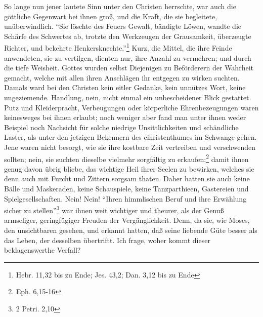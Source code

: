 So lange nun jener lautete Sinn unter den Christen herrschte, war auch die göttliche Gegenwart bei ihnen groß, und die Kraft, die sie begleitete, unüberwindlich. "`Sie löschte des Feuers Gewalt, bändigte Löwen, wandte die Schärfe des Schwertes ab, trotzte den Werkzeugen der Grausamkeit, überzeugte Richter, und bekehrte Henkersknechte."'\footnote{Hebr. 11,32 bis zu Ende; Jes. 43,2; Dan. 3,12 bis zu Ende} Kurz, die Mittel, die ihre Feinde anwendeten, sie zu vertilgen, dienten nur, ihre Anzahl zu vermehren; und durch die tiefe Weisheit. Gottes wurden selbst Diejenigen zu Beförderern der Wahrheit gemacht, welche mit allen ihren Anschlägen ihr entgegen zu wirken suchten. Damals ward bei den Christen kein eitler Gedanke, kein unnützes Wort, keine ungeziemende. Handlung, nein, nicht einmal ein unbescheidener Blick gestattet. Putz und Kleiderpracht, Verbeugungen oder körperliche Ehrenbezeugungen waren keinesweges bei ihnen erlaubt; noch weniger aber fand man unter ihnen weder Beispiel noch Nachsicht für solche niedrige Unsittlichkeiten und schändliche Laster, als unter den jetzigen Bekennern des cihristenthumes im Schwange gehen. Jene waren nicht besorgt, wie sie ihre kostbare Zeit vertreiben und verschwenden sollten; nein, sie suchten dieselbe vielmehr sorgfältig zu erkaufen;\footnote{Eph. 6,15-16} damit ihnen genug davon übrig bliebe, das wichtige Heil ihrer Seelen zu bewirken, welches sie denn auch mit Furcht und Zittern sorgsam thaten. Daher hatten sie auch keine Bälle und Maskeraden, keine Schauspiele, keine Tanzparthieen, Gastereien und Spielgesellschaften. Nein! Nein! "`Ihren himmlischen Beruf und ihre Erwählung sicher zu stellen"'\footnote{2 Petri. 2,10} war ihnen weit wichtiger und theurer, als der Genuß armseliger, geringfügiger Freuden der Vergänglichkeit. Denn, da sie, wie Moses, den unsichtbaren gesehen, und erkannt hatten, daß seine liebende Güte besser als das Leben, der desselben übertriftt. Ich frage, woher kommt dieser beklagenswerthe Verfall?

